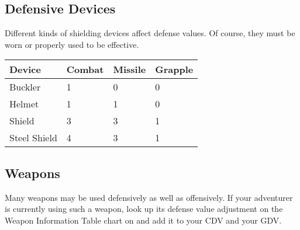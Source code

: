 \subsection{Defensive Devices}

Different kinds of shielding devices affect defense values. Of course, they must be worn or properly used to be effective.
\begin{normboxc}
\small
\begin{tabular}{l l l l}
\textbf{Device}  & \textbf{Combat}  & \textbf{Missile}  & \textbf{Grapple} \\
\midrule
Buckler & 1 & 0 & 0\\
Helmet & 1 & 1 & 0\\
Shield & 3 & 3 & 1\\
Steel Shield & 4 & 3 & 1\\
\end{tabular}
\end{normboxc}
\subsection{Weapons}

Many weapons may be used defensively as well as offensively. If your adventurer is currently using such a weapon, look up its defense value adjustment on the Weapon Information Table chart on  and add it to your CDV and your GDV.
